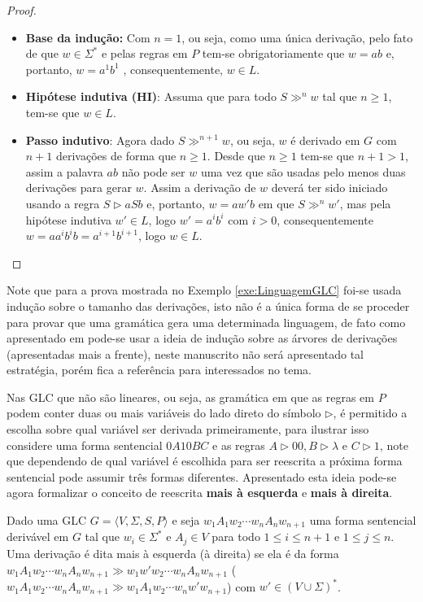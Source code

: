\begin{exem}
\begin{proof}
		\begin{itemize}
			\item[ ] \textbf{Base da indução:} Com $n=1$, ou seja, como uma única derivação, pelo fato de que $w \in \Sigma^*$ e pelas regras em $P$ tem-se obrigatoriamente que $w = ab$ e, portanto, $w = a^1b^1$ , consequentemente, $w \in L$.
			\item[ ] \textbf{Hipótese indutiva (HI)}: Assuma que para todo $S \gg^n w$ tal que $n \geq 1$, tem-se que $w \in L$.
			\item[ ] \textbf{Passo indutivo}: Agora dado $S \gg^{n+1} w$, ou seja, $w$ é derivado em $G$ com $n + 1$ derivações de forma que $n \geq 1$. Desde que $n  \geq 1$ tem-se que $n + 1  > 1$, assim a palavra $ab$ não pode ser $w$ uma vez que são usadas pelo menos duas derivações para gerar $w$. Assim a derivação de $w$ deverá ter sido iniciado usando a regra $S \rhd aSb$ e, portanto, $w = aw'b$ em que $S \gg^n w'$, mas pela hipótese indutiva $w' \in L$, logo $w' = a^ib^i$ com $i > 0$, consequentemente $w = aa^ib^ib = a^{i+1}b^{i+1}$, logo $w \in L$.
		\end{itemize}
	\end{proof}
\end{exem}

Note que para a prova mostrada no Exemplo \ref{exe:LinguagemGLC} foi-se usada indução sobre o tamanho das derivações, isto não é a única forma de se proceder para provar que uma gramática gera uma determinada linguagem, de  fato como apresentado em \cite{hopcroft2008} pode-se usar a ideia de indução sobre as árvores de derivações (apresentadas mais a frente), neste manuscrito não será apresentado tal estratégia, porém fica a referência para interessados no tema. 

Nas GLC que não são lineares, ou seja, as gramática em que as regras em $P$ podem conter duas ou mais variáveis do lado direto do símbolo $\rhd$, é permitido a escolha sobre qual variável ser derivada primeiramente, para ilustrar isso considere uma forma sentencial $0A10BC$ e as regras $A \rhd 00, B \rhd \lambda$ e $C \rhd 1$, note que dependendo de qual variável é escolhida para ser reescrita a próxima forma sentencial pode assumir três formas diferentes. Apresentado esta ideia pode-se agora formalizar o conceito de reescrita \textbf{mais à esquerda} e \textbf{mais à direita}.

\begin{definition}\label{def:TiposLateraisReescrita}
	Dado uma GLC $G = \langle V, \Sigma, S, P\rangle$ e seja $w_1A_1w_2\cdots w_nA_nw_{n+1}$ uma forma sentencial derivável em $G$ tal que $w_i \in \Sigma^*$ e $A_j \in V$ para todo $1 \leq i \leq n+1$ e $1 \leq j \leq n$. Uma derivação é dita mais à esquerda (à direita) se ela é da forma $w_1A_1w_2\cdots w_nA_nw_{n+1} \gg w_1w'w_2\cdots w_nA_nw_{n+1}$ ($w_1A_1w_2\cdots w_nA_nw_{n+1} \gg w_1A_1w_2\cdots w_nw'w_{n+1}$)  com  $w' \in (V \cup \Sigma)^*$.
\end{definition}

